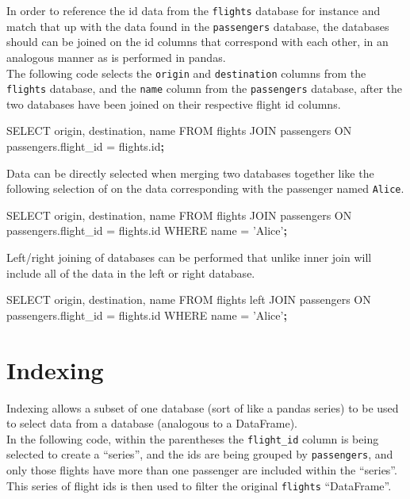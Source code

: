 \documentclass[]{book}
\newenvironment{Shaded}{\begin{snugshade}}{\end{snugshade}}
\newcommand{\KeywordTok}[1]{\textcolor[rgb]{0.13,0.29,0.53}{\textbf{#1}}}
\newcommand{\StringTok}[1]{\textcolor[rgb]{0.31,0.60,0.02}{#1}}
\newcommand{\ExtensionTok}[1]{#1}
\newcommand{\NormalTok}[1]{#1}
\begin{document}
In order to reference the id data from the \texttt{flights} database for
instance and match that up with the data found in the
\texttt{passengers} database, the databases should can be joined on the
id columns that correspond with each other, in an analogous manner as is
performed in pandas.\\
The following code selects the \texttt{origin} and \texttt{destination}
columns from the \texttt{flights} database, and the \texttt{name} column
from the \texttt{passengers} database, after the two databases have been
joined on their respective flight id columns.

\begin{Shaded}
\begin{Highlighting}[]
\ExtensionTok{SELECT}\NormalTok{ origin, destination, name FROM flights JOIN passengers ON passengers.flight_id = flights.id}\KeywordTok{;}
\end{Highlighting}
\end{Shaded}

Data can be directly selected when merging two databases together like
the following selection of on the data corresponding with the passenger
named \texttt{Alice}.

\begin{Shaded}
\begin{Highlighting}[]
\ExtensionTok{SELECT}\NormalTok{ origin, destination, name FROM flights JOIN passengers ON passengers.flight_id = flights.id WHERE name = }\StringTok{'Alice'}\KeywordTok{;}
\end{Highlighting}
\end{Shaded}

Left/right joining of databases can be performed that unlike inner join
will include all of the data in the left or right database.

\begin{Shaded}
\begin{Highlighting}[]
\ExtensionTok{SELECT}\NormalTok{ origin, destination, name FROM flights left JOIN passengers ON passengers.flight_id = flights.id WHERE name = }\StringTok{'Alice'}\KeywordTok{;}
\end{Highlighting}
\end{Shaded}

\section{Indexing}\label{indexing}

Indexing allows a subset of one database (sort of like a pandas series)
to be used to select data from a database (analogous to a DataFrame).\\
In the following code, within the parentheses the \texttt{flight\_id}
column is being selected to create a ``series'', and the ids are being
grouped by \texttt{passengers}, and only those flights have more than
one passenger are included within the ``series''. This series of flight
ids is then used to filter the original \texttt{flights} ``DataFrame''.
\end{document}
